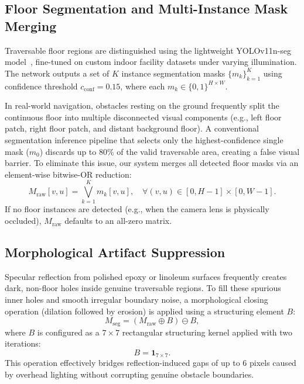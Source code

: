 \documentclass{ieeeaccess}
\begin{document}
\subsection{Floor Segmentation and Multi-Instance Mask Merging}
\label{subsec:floor_seg}
Traversable floor regions are distinguished using the lightweight YOLOv11n-seg model~\cite{ultralytics_2024_ultralytics}, fine-tuned on custom indoor facility datasets under varying illumination. The network outputs a set of $K$ instance segmentation masks $\{m_k\}_{k=1}^K$ using confidence threshold $c_{\mathrm{conf}} = 0.15$, where each $m_k \in \{0, 1\}^{H \times W}$.

In real-world navigation, obstacles resting on the ground frequently split the continuous floor into multiple disconnected visual components (e.g., left floor patch, right floor patch, and distant background floor). A conventional segmentation inference pipeline that selects only the highest-confidence single mask ($m_0$) discards up to 80\% of the valid traversable area, creating a false visual barrier. To eliminate this issue, our system merges all detected floor masks via an element-wise bitwise-OR reduction:
\begin{equation}
  M_{\mathrm{raw}}[v, u] = \bigvee_{k=1}^K m_k[v, u], \quad \forall (v, u) \in [0, H-1] \times [0, W-1].
\end{equation}
If no floor instances are detected (e.g., when the camera lens is physically occluded), $M_{\mathrm{raw}}$ defaults to an all-zero matrix.

\subsection{Morphological Artifact Suppression}
Specular reflection from polished epoxy or linoleum surfaces frequently creates dark, non-floor holes inside genuine traversable regions. To fill these spurious inner holes and smooth irregular boundary noise, a morphological closing operation (dilation followed by erosion) is applied using a structuring element $B$:
\begin{equation}
  M_{\mathrm{seg}} = (M_{\mathrm{raw}} \oplus B) \ominus B,
\end{equation}
where $B$ is configured as a $7 \times 7$ rectangular structuring kernel applied with two iterations:
\begin{equation}
  B = \mathbf{1}_{7 \times 7}.
\end{equation}
This operation effectively bridges reflection-induced gaps of up to 6 pixels caused by overhead lighting without corrupting genuine obstacle boundaries.
\end{document}
